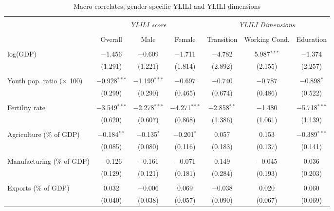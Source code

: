 \begin{table}[H] 
\footnotesize
\centering
\caption{\textrm{\normalfont \small Macro correlates, gender-specific YLILI and YLILI dimensions \label{tab:regwide}}}
 \begin{threeparttable}
 \begin{tabular}{@{\extracolsep{-10pt}}lcccccc} 
\\[-1.8ex]\hline 
\hline \\[-1.8ex] 
 & \multicolumn{3}{c}{\textit{YLILI score}} & \multicolumn{3}{c}{\textit{YLILI Dimensions}} \\ 
\cline{3-3} \cline{6-6} 
\\[-1.8ex] & Overall & Male & Female & Transition & Working Cond. & Education \\ 
\hline \\[-1.8ex] 
 log(GDP) & $-$1.456 & $-$0.609 & $-$1.711 & $-$4.782 & 5.987$^{***}$ & $-$1.374 \\ 
  & (1.291) & (1.221) & (1.814) & (2.892) & (2.155) & (2.257) \\ 
  & & & & & & \\ 
 Youth pop. ratio ($\times$ 100) & $-$0.928$^{***}$ & $-$1.199$^{***}$ & $-$0.697 & $-$0.740 & $-$0.787 & $-$0.898$^{*}$ \\ 
  & (0.299) & (0.290) & (0.465) & (0.674) & (0.486) & (0.522) \\ 
  & & & & & & \\ 
 Fertility rate & $-$3.549$^{***}$ & $-$2.278$^{***}$ & $-$4.271$^{***}$ & $-$2.858$^{**}$ & $-$1.480 & $-$5.718$^{***}$ \\ 
  & (0.620) & (0.607) & (0.868) & (1.386) & (1.061) & (1.139) \\ 
  & & & & & & \\ 
 Agriculture (\% of GDP) & $-$0.184$^{**}$ & $-$0.135$^{*}$ & $-$0.201$^{*}$ & 0.057 & 0.153 & $-$0.389$^{***}$ \\ 
  & (0.085) & (0.080) & (0.116) & (0.183) & (0.137) & (0.141) \\ 
  & & & & & & \\ 
 Manufacturing (\% of GDP) & $-$0.126 & $-$0.161 & $-$0.071 & 0.149 & $-$0.045 & 0.036 \\ 
  & (0.129) & (0.121) & (0.181) & (0.284) & (0.193) & (0.203) \\ 
  & & & & & & \\ 
 Exports (\% of GDP) & 0.032 & $-$0.006 & 0.069 & $-$0.038 & 0.020 & 0.060 \\ 
  & (0.040) & (0.038) & (0.057) & (0.090) & (0.067) & (0.069) \\ 

\end{tabular}
\end{threeparttable}
\end{table}
